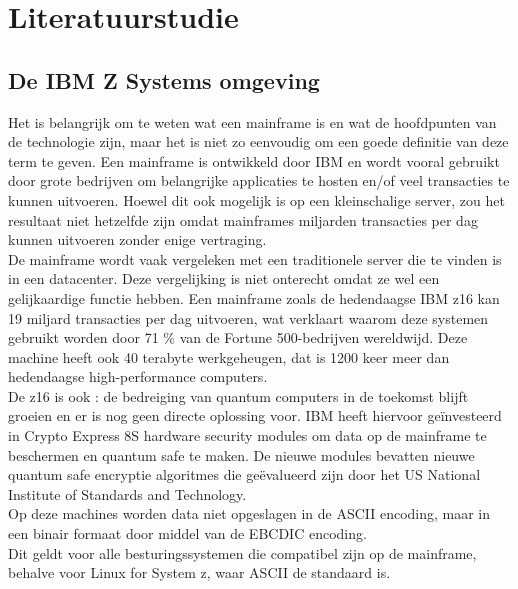 
\chapter{Literatuurstudie}
\label{ch:literatuurstudie}

\section{De IBM Z Systems omgeving}
\label{sec:De IBM Z Systems omgeving}
Het is belangrijk om te weten wat een mainframe is en wat de hoofdpunten van de technologie zijn, maar het is niet zo eenvoudig om een goede definitie van deze term te geven. Een mainframe is ontwikkeld door IBM en wordt vooral gebruikt door grote bedrijven om belangrijke applicaties te hosten en/of veel transacties te kunnen uitvoeren. Hoewel dit ook mogelijk is op een kleinschalige server, zou het resultaat niet hetzelfde zijn omdat mainframes miljarden transacties per dag kunnen uitvoeren zonder enige vertraging. \autocite{BasuMallick2023} \\

De mainframe wordt vaak vergeleken met een traditionele server die te vinden is in een datacenter. Deze vergelijking is niet onterecht omdat ze wel een gelijkaardige functie hebben. Een mainframe zoals de hedendaagse IBM z16 kan 19 miljard transacties per dag uitvoeren, wat verklaart waarom deze systemen gebruikt worden door 71 \% van de Fortune 500-bedrijven wereldwijd. Deze machine heeft ook 40 terabyte werkgeheugen, dat is 1200 keer meer dan hedendaagse high-performance computers. \autocite{Tozzi2022} \\

De z16 is ook : de bedreiging van quantum computers in de toekomst blijft groeien en er is nog geen directe oplossing voor. IBM heeft hiervoor geïnvesteerd in Crypto Express 8S hardware security modules om data op de mainframe te beschermen en quantum safe te maken. De nieuwe modules bevatten nieuwe quantum safe encryptie algoritmes die geëvalueerd zijn door het US National Institute of Standards and Technology. \autocite{Sayer2022} \\

Op deze machines worden data niet opgeslagen in de ASCII encoding, maar in een binair formaat door middel van de EBCDIC encoding. \autocite{Singhal2023} \\ Dit geldt voor alle besturingssystemen die compatibel zijn op de mainframe, behalve voor Linux for System z, waar ASCII de standaard is. \autocite{IBMb}


